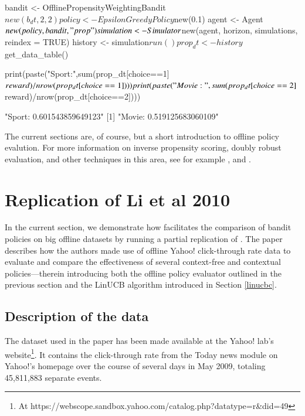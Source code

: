 \documentclass{jss}
\begin{document}
\begin{CodeChunk}
\begin{CodeInput}
bandit                 <- OfflinePropensityWeightingBandit$new(b_dt,2,2)
policy                 <- EpsilonGreedyPolicy$new(0.1)
agent                  <- Agent$new(policy, bandit, "prop")
simulation             <- Simulator$new(agent, horizon, simulations, reindex = TRUE)
history                <- simulation$run()
prop_dt                <- history$get_data_table()

print(paste("Sport:",sum(prop_dt[choice==1]$reward)/nrow(prop_dt[choice==1])))
print(paste("Movie:",sum(prop_dt[choice==2]$reward)/nrow(prop_dt[choice==2])))
\end{CodeInput}
\begin{CodeOutput}
[1] "Sport: 0.601543859649123"
[1] "Movie: 0.519125683060109"
\end{CodeOutput}
\end{CodeChunk}

The current sections are, of course, but a short introduction to offline policy evalution. For more information on inverse propensity scoring, doubly robust evaluation, and other techniques in this area, see for example \citet{Agarwal20141},  \citet{Dudik2011} and \citet{Swaminathan2015}.

\section{Replication of Li et al 2010} \label{repl}

In the current section, we demonstrate how  facilitates the comparison of bandit policies on big offline datasets by running a partial replication of \cite{Li2010}. The paper describes how the authors made use of offline Yahoo! click-through rate data to evaluate and compare the effectiveness of several context-free and contextual policies---therein introducing both the offline policy evaluator outlined in the previous section and the LinUCB algorithm introduced in Section \ref{linucbc}.

\subsection{Description of the data} \label{datadesc}

The dataset used in the \cite{Li2010} paper has been made available at the Yahoo! lab's website\footnote{At https://webscope.sandbox.yahoo.com/catalog.php?datatype=r\&did=49}. It contains the click-through rate from the Today news module on Yahoo!'s homepage over the course of several days in May 2009, totaling 45,811,883 separate events.
\end{document}
